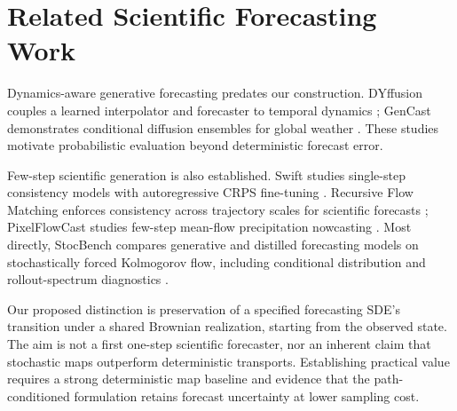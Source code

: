 \section{Related Scientific Forecasting Work}
Dynamics-aware generative forecasting predates our construction. DYffusion couples a learned interpolator and forecaster to temporal dynamics \citep{cachay2023dyffusion}; GenCast demonstrates conditional diffusion ensembles for global weather \citep{price2025gencast}. These studies motivate probabilistic evaluation beyond deterministic forecast error.

Few-step scientific generation is also established. Swift studies single-step consistency models with autoregressive CRPS fine-tuning \citep{stock2025swift}. Recursive Flow Matching enforces consistency across trajectory scales for scientific forecasts \citep{huang2026recursive}; PixelFlowCast studies few-step mean-flow precipitation nowcasting \citep{zhu2026pixelflowcast}. Most directly, StocBench compares generative and distilled forecasting models on stochastically forced Kolmogorov flow, including conditional distribution and rollout-spectrum diagnostics \citep{pfister2026stocbench}.

Our proposed distinction is preservation of a specified forecasting SDE's transition under a shared Brownian realization, starting from the observed state. The aim is not a first one-step scientific forecaster, nor an inherent claim that stochastic maps outperform deterministic transports. Establishing practical value requires a strong deterministic map baseline and evidence that the path-conditioned formulation retains forecast uncertainty at lower sampling cost.
